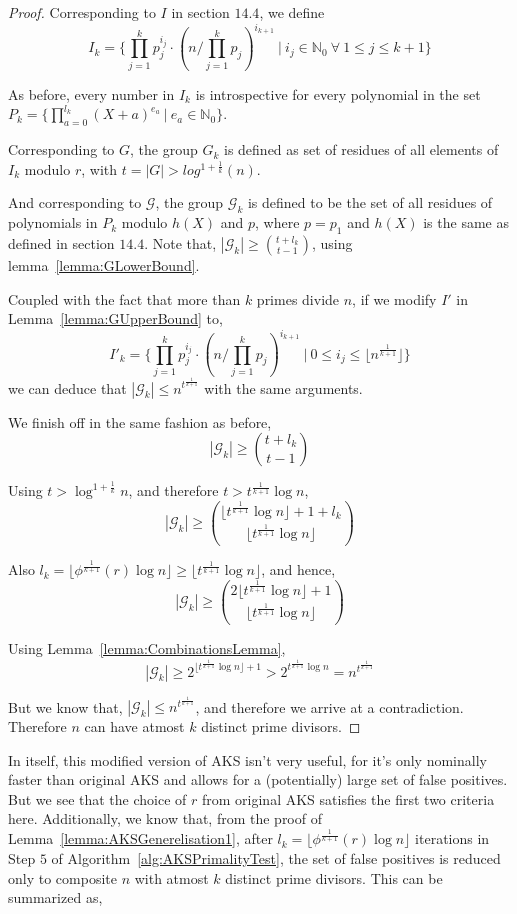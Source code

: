 \documentclass[11pt]{article}
\begin{document}
\begin{proof}
Corresponding to $I$ in section $14.4$, we define
\[I_k = \{ \prod_{j=1}^{k}p_j^{i_j} \cdot (n/\prod_{j=1}^{k}p_j)^{i_{k+1}}\ |\ i_j \in \mathbb{N}_0\ \forall\ 1\leq j \leq k+1 \}\]

As before, every number‌ in $I_k$ is introspective for every polynomial in the set $P_k = \{\prod_{a=0}^{l_k}{(X+a)^{e_a}}\ |\ e_a \in \mathbb{N}_0\}$.

Corresponding to $G$, the group $G_k$ is defined as set of residues of all elements of $I_k$ modulo $r$, with $t = |G| > log^{1+\frac{1}{k}}(n)$.

And corresponding to $\mathcal{G}$, the group $\mathcal{G}_k$ is defined to be the set of all residues of polynomials in $P_k$ modulo $h(X)$ and $p$, where $p = p_1$ and $h(X)$ is the same as defined in section $14.4$. Note that, $|\mathcal{G}_k| \geq {{t+l_k} \choose {t-1}}$, using lemma~\ref{lemma:GLowerBound}.

Coupled with the fact that more than $k$ primes divide $n$, if we modify $I'$ in Lemma~\ref{lemma:GUpperBound} to,
\[I'_k = \{ \prod_{j=1}^{k}p_j^{i_j} \cdot (n/\prod_{j=1}^{k}p_j)^{i_{k+1}} \ \vert \ 0 \leq i_j \leq \lfloor n^\frac{1}{k+1} \rfloor \}\]
we can deduce that $|\mathcal{G}_k| \leq n^{t^{\frac{1}{k+1}}}$ with the same arguments.

We finish off in the same fashion as before, 
\[|\mathcal{G}_k| \geq {{t+l_k} \choose {t-1}}\]

Using $t > \log^{1+\frac{1}{k}} n$, and therefore $t > t^{\frac{1}{k+1}} \log n$,
\[|\mathcal{G}_k| \geq {{{\lfloor t^{\frac{1}{k+1}} \log n \rfloor} + 1 + l_k} \choose {\lfloor t^{\frac{1}{k+1}} \log n \rfloor}}\]

Also $l_k = \lfloor \phi^\frac{1}{k+1}(r) \log n \rfloor \geq \lfloor t^{\frac{1}{k+1}} \log{n} \rfloor$, and hence,
\[|\mathcal{G}_k| \geq {{2{\lfloor t^{\frac{1}{k+1}} \log n \rfloor}+1} \choose {\lfloor t^{\frac{1}{k+1}} \log n \rfloor}}\]

Using Lemma~\ref{lemma:CombinationsLemma},
\[|\mathcal{G}_k| \geq 2^{{\lfloor t^{\frac{1}{k+1}} \log n \rfloor}+1} > 2^{t^{\frac{1}{k+1}} \log n} = n^{t^{\frac{1}{k+1}}}\]

But we know that, $|\mathcal{G}_k| \leq n^{t^{\frac{1}{k+1}}}$, and therefore we arrive at a contradiction. Therefore $n$ can have atmost $k$ distinct prime divisors.
\end{proof}

In itself, this modified version of AKS isn't very useful, for it's only nominally faster than original AKS and allows for a (potentially) large set of false positives. But we see that the choice of $r$ from original AKS satisfies the first two criteria here. Additionally, we know that, from the proof of Lemma~\ref{lemma:AKSGenerelisation1}, after $l_k = \lfloor \phi^\frac{1}{k+1}(r) \log n \rfloor$ iterations in Step $5$ of Algorithm~\ref{alg:AKSPrimalityTest}, the set of false positives is reduced only to composite $n$ with atmost $k$ distinct prime divisors. This can be summarized as,
\end{document}

